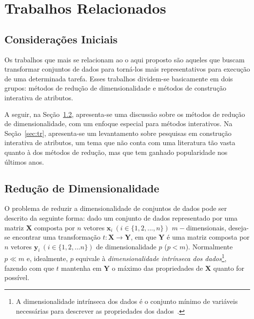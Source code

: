 \chapter{Trabalhos Relacionados}\label{chap:revisao}

\section{Considerações Iniciais}

Os trabalhos que mais se relacionam ao o aqui proposto são
aqueles que buscam transformar conjuntos de dados para
torná-los mais representativos para execução de uma
determinada tarefa. Esses trabalhos dividem-se basicamente
em dois grupos: métodos de redução de dimensionalidade e
métodos de construção interativa de atributos. 

A seguir, na Seção~\ref{sec:rd}, apresenta-se uma discussão
sobre os métodos de redução de dimensionalidade, com um
enfoque especial para métodos interativos. Na
Seção~\ref{sec:tr}, apresenta-se um levantamento sobre
pesquisas em construção interativa de atributos, um tema que
não conta com uma literatura tão vasta quanto à dos métodos
de redução, mas que tem ganhado popularidade nos últimos
anos. 

\section{Redução de Dimensionalidade}\label{sec:rd}

O problema de reduzir a dimensionalidade de conjuntos
de dados pode ser descrito da seguinte forma: dado um
conjunto de dados representado por uma matriz $\textbf{X}$
composta por $n$ vetores $\textbf{x}_i~(i \in
\{1,2,...,n\})$ $m-$dimensionais, deseja-se encontrar uma
transformação $t: \textbf{X} \rightarrow \textbf{Y}$, em que
$\textbf{Y}$ é uma matriz composta por $n$ vetores
$\textbf{y}_i~(i \in \{1,2,...n\})$ de dimensionalidade $p$
($p < m$).  Normalmente $p \ll m$ e, idealmente, $p$
equivale à  \emph{dimensionalidade intrínseca dos dados}\footnote{A
dimensionalidade intrínseca dos dados é o conjunto
mínimo de variáveis necessárias para descrever as
propriedades dos dados~\cite{Fukunaga1990}.}, fazendo
com que $t$ mantenha em $\textbf{Y}$ o máximo das
propriedades de $\textbf{X}$ quanto for possível. 

